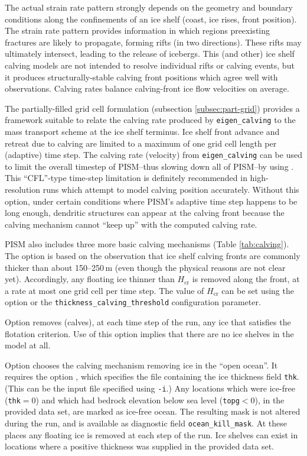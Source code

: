 The actual strain rate pattern strongly depends on the geometry and boundary conditions along the confinements of an ice shelf (coast, ice rises, front position).  The strain rate pattern provides information in which regions preexisting fractures are likely to propagate, forming rifts (in two directions).  These rifts may ultimately intersect, leading to the release of icebergs.  This (and other) ice shelf calving models are not intended to resolve individual rifts or calving events, but it produces structurally-stable calving front positions which agree well with observations.  Calving rates balance calving-front ice flow velocities on average.

The partially-filled grid cell formulation (subsection \ref{subsec:part-grid}) provides a framework suitable to relate the calving rate produced by \texttt{eigen_calving} to the mass transport scheme at the ice shelf terminus.  Ice shelf front advance and retreat due to calving are limited to a maximum of one grid cell length per (adaptive) time step.  The calving rate (velocity) from \texttt{eigen_calving} can be used to limit the overall timestep of PISM--thus slowing down all of PISM--by using .  This ``CFL''-type time-step limitation is definitely recommended in high-resolution runs which attempt to model calving position accurately.  Without this option, under certain conditions where PISM's adaptive time step happens to be long enough, dendritic structures can appear at the calving front because the calving mechanism cannot ``keep up'' with the computed calving rate.

PISM also includes three more basic calving mechanisms (Table \ref{tab:calving}). The option  is based on the observation that ice shelf calving fronts are commonly thicker than about 150--250\,m (even though the physical reasons are not clear yet). Accordingly, any floating ice thinner than $H_{\textrm{cr}}$ is removed along the front, at a rate at most one grid cell per time step. The value of $H_{\mathrm{cr}}$ can be set using the  option or the \texttt{thickness_calving_threshold} configuration parameter.

Option  removes (calves), at each time step of the run, any ice that satisfies the flotation criterion.  Use of this option implies that there are no ice shelves in the model at all.

Option  chooses the calving mechanism removing ice in the ``open ocean''. It requires the option , which specifies the file containing the ice thickness field \texttt{thk}. (This can be the input file specified using \texttt{-i}.) Any locations which were ice-free (\texttt{thk}$=0$) and which had bedrock elevation below sea level (\texttt{topg}$<0$), in the provided data set, are marked as ice-free ocean.  The resulting mask is not altered during the run, and is available as diagnostic field \texttt{ocean_kill_mask}.  At these places any floating ice is removed at each step of the run.  Ice shelves can exist in locations where a positive thickness was supplied in the provided data set.

